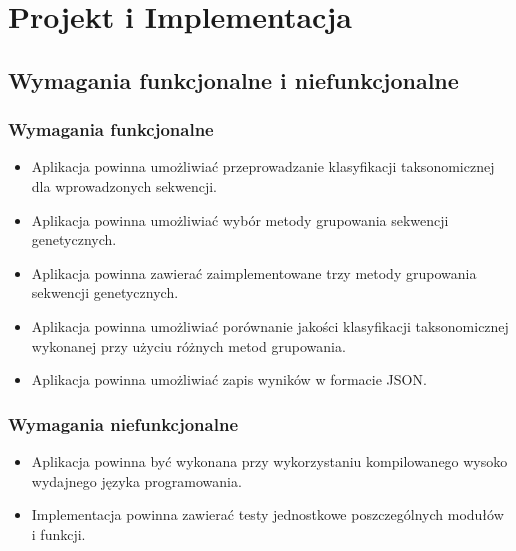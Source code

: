 \clearpage
\section{Projekt i Implementacja}

    \subsection{Wymagania funkcjonalne i niefunkcjonalne}

        \subsubsection{Wymagania funkcjonalne}

            \begin{itemize}
                \item Aplikacja powinna umożliwiać przeprowadzanie klasyfikacji taksonomicznej dla wprowadzonych sekwencji.
                \item Aplikacja powinna umożliwiać wybór metody grupowania sekwencji genetycznych.
                \item Aplikacja powinna zawierać zaimplementowane trzy metody grupowania sekwencji genetycznych.
                \item Aplikacja powinna umożliwiać porównanie jakości klasyfikacji taksonomicznej wykonanej przy użyciu różnych metod grupowania.
                \item Aplikacja powinna umożliwiać zapis wyników w formacie JSON.
            \end{itemize}

        \subsubsection{Wymagania niefunkcjonalne}

            \begin{itemize}
                \item Aplikacja powinna być wykonana przy wykorzystaniu kompilowanego wysoko wydajnego języka programowania.
                \item Implementacja powinna zawierać testy jednostkowe poszczególnych modułów i funkcji.
            \end{itemize}

